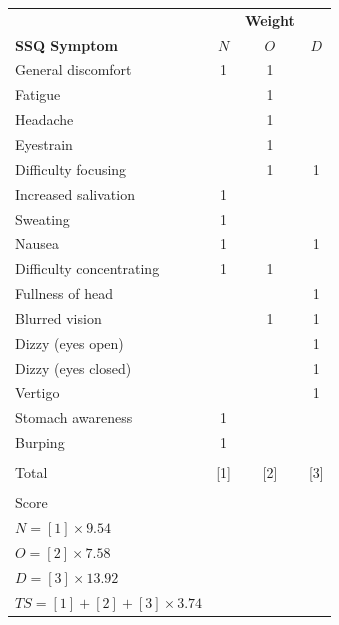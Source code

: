 \begin{center}
    \begin{tabular}{ l c c c}
        \toprule
        \textbf{ } & \textbf{ } & \textbf{Weight} & \textbf{ } \\
        \textbf{SSQ Symptom} & \textbf{$N$} & \textbf{$O$} & \textbf{$D$} \\
        \midrule
        General discomfort          & 1 & 1 &   \\
        Fatigue                     &   & 1 &   \\
        Headache                    &   & 1 &   \\
        Eyestrain                   &   & 1 &   \\
        Difficulty focusing         &   & 1 & 1 \\
        Increased salivation        & 1 &   &   \\
        Sweating                    & 1 &   &   \\
        Nausea                      & 1 &   & 1 \\
        Difficulty concentrating    & 1 & 1 &   \\
        Fullness of head            &   &   & 1 \\
        Blurred vision              &   & 1 & 1 \\
        Dizzy (eyes open)           &   &   & 1 \\
        Dizzy (eyes closed)         &   &   & 1 \\
        Vertigo                     &   &   & 1 \\
        Stomach awareness           & 1 &   &   \\
        Burping                     & 1 &   &   \\
        \\
        Total                       & [1] & [2] & [3] \\
        \\
        Score & & & \\
        $N = [1] \times 9.54$ & & & \\
        $O = [2] \times 7.58$ & & & \\
        $D = [3] \times 13.92$ & & & \\
        $TS = [1] + [2] + [3] \times 3.74$ & & & \\
        \bottomrule
    \end{tabular}
    \label{tab:ssq-scoring}
\end{center}

